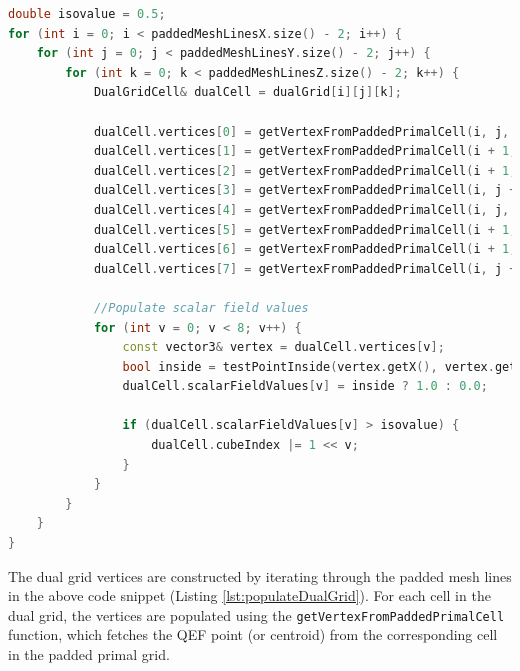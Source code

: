 \vspace{2mm}
\begin{lstlisting}[language=C++, caption=Populating the Dual Grid with QEF Points, label=lst:populateDualGrid]
double isovalue = 0.5;
for (int i = 0; i < paddedMeshLinesX.size() - 2; i++) {
    for (int j = 0; j < paddedMeshLinesY.size() - 2; j++) {
        for (int k = 0; k < paddedMeshLinesZ.size() - 2; k++) {
            DualGridCell& dualCell = dualGrid[i][j][k];  
    
            dualCell.vertices[0] = getVertexFromPaddedPrimalCell(i, j, k, paddedPrimalGrid);
            dualCell.vertices[1] = getVertexFromPaddedPrimalCell(i + 1, j, k, paddedPrimalGrid);
            dualCell.vertices[2] = getVertexFromPaddedPrimalCell(i + 1, j + 1, k, paddedPrimalGrid);
            dualCell.vertices[3] = getVertexFromPaddedPrimalCell(i, j + 1, k, paddedPrimalGrid);
            dualCell.vertices[4] = getVertexFromPaddedPrimalCell(i, j, k + 1, paddedPrimalGrid);
            dualCell.vertices[5] = getVertexFromPaddedPrimalCell(i + 1, j, k + 1, paddedPrimalGrid);
            dualCell.vertices[6] = getVertexFromPaddedPrimalCell(i + 1, j + 1, k + 1, paddedPrimalGrid);
            dualCell.vertices[7] = getVertexFromPaddedPrimalCell(i, j + 1, k + 1, paddedPrimalGrid);
    
            //Populate scalar field values
            for (int v = 0; v < 8; v++) {
                const vector3& vertex = dualCell.vertices[v];
                bool inside = testPointInside(vertex.getX(), vertex.getY(), vertex.getZ());
                dualCell.scalarFieldValues[v] = inside ? 1.0 : 0.0;  
    
                if (dualCell.scalarFieldValues[v] > isovalue) {
                    dualCell.cubeIndex |= 1 << v;
                }
            }
        }
    }
}
\end{lstlisting}
\vspace{2mm}

The dual grid vertices are constructed by iterating through the padded mesh lines in the above code snippet (Listing \ref{lst:populateDualGrid}). For each cell in the dual grid, the vertices are populated using the \texttt{getVertexFromPaddedPrimalCell} function, which fetches the QEF point (or centroid) from the corresponding cell in the padded primal grid.

